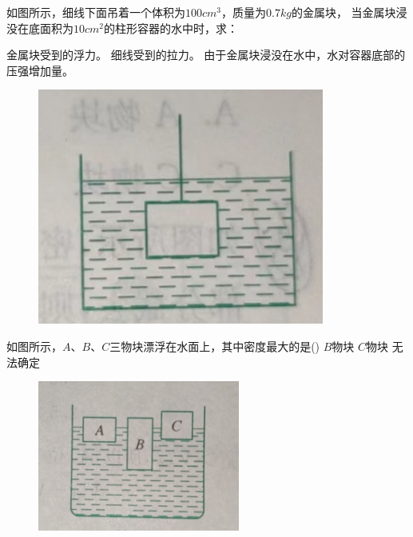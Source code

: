 \documentclass[a4paper,cs4size]{BHCexam}
\begin{document}
\begin{groups}
\begin{questions}[]
        \question[5] 如图所示，细线下面吊着一个体积为$100cm^3$，质量为$0.7kg$的金属块，
        当金属块浸没在底面积为$10cm^2$的柱形容器的水中时，求：
        \begin{subquestions}
            \subquestion 金属块受到的浮力。
            \subquestion 细线受到的拉力。
            \subquestion 由于金属块浸没在水中，水对容器底部的压强增加量。
        \end{subquestions}
        \begin{figure}[htb]
            \flushright
            \includegraphics [scale=0.5,trim=0 0 0 0]{./image/pyhsics_buoyantforce_4.png}
            \label{fig:fig_buoyantforce_4.png}
        \end{figure}
        \vspace{5cm}

        \question[5] 如图所示，$A$、$B$、$C$三物块漂浮在水面上，其中密度最大的是(\quad\quad\quad\quad)
        {$B$物块}
        {$C$物块}
        {无法确定}
        \begin{figure}[htb]
            \flushright
            \includegraphics [scale=0.6,trim=0 0 0 0]{./image/pyhsics_buoyantforce_5.png}
            \label{fig:fig_buoyantforce_5.png}
        \end{figure}
        \vspace{0.5cm}



\end{questions}
\end{groups}
\end{document}
